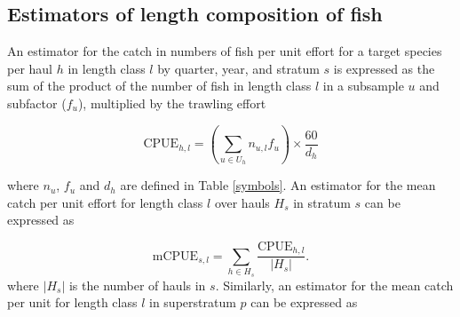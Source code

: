 \documentclass[a4paper 12pt]{article}
\numberwithin{equation}{section}
\begin{document}

\subsection{Estimators of length composition of fish}
\label{estimatorsoflength}
An estimator for the catch in numbers of fish per unit effort for a target species   per haul $h$ in length class $l$ by quarter, year, and stratum $s$ is expressed as the sum of the product of the number of fish in length class $l$ in a subsample $u$ and subfactor ($f_{u}$), multiplied by the trawling effort

\begin{equation}
\mathrm{CPUE}_{h,l} = \displaystyle \left(\sum\limits_{u \in U_{h}} n_{u,l}f_{u} \right) \times \frac{60}{d_{h}}
\label{cpuelength}
\end{equation}

\noindent where $n_{u} $, $f_{u}$ and $d_{h}$ are defined in Table \ref{symbols}. An estimator for the mean catch per unit effort for length class $l$ over hauls $H_{s}$ in stratum $s$  can be expressed as 

\begin{equation}
\mathrm{mCPUE}_{s,l} = \displaystyle\sum\limits_{h \in H_{s}} \frac{\mathrm{CPUE}_{h,l}}{|H_{s}|}.
\label{mcpuelength}
\end{equation}
\noindent where $|H_{s}|$ is the number of hauls in $s$. Similarly, an estimator for the mean catch per unit for length class $l$ in superstratum $p$ can be expressed as
\end{document}
